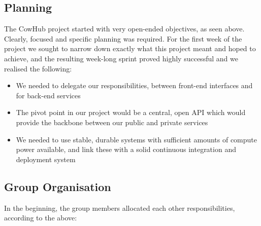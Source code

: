 
\subsection{Planning}

The CowHub project started with very open-ended objectives, as seen above. Clearly, focused and specific planning was required. For the first week of the project we sought to narrow down exactly what this project meant and hoped to achieve, and the resulting week-long sprint proved highly successful and we realised the following:

\begin{itemize}
	\item We needed to delegate our responsibilities, between front-end interfaces and for back-end services
	\item The pivot point in our project would be a central, open API which would provide the backbone between our public and private services
	\item We needed to use stable, durable systems with sufficient amounts of compute power available, and link these with a solid continuous integration and deployment system
\end{itemize}


\subsection{Group Organisation}

In the beginning, the group members allocated each other responsibilities, according to the above:

